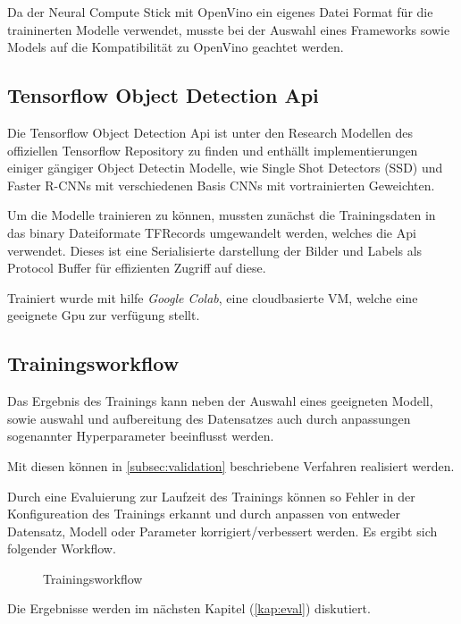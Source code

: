 Da der Neural Compute Stick mit OpenVino ein eigenes Datei Format 
für die traininerten Modelle verwendet, musste bei der Auswahl
eines Frameworks sowie Models auf die Kompatibilität zu OpenVino 
geachtet werden. 



\subsection{Tensorflow Object Detection Api}

Die Tensorflow Object Detection Api ist unter den Research Modellen
\cite{tfobjdet} des offiziellen Tensorflow Repository zu
finden und enthällt implementierungen einiger gängiger Object Detectin
Modelle, wie Single Shot Detectors (SSD) und Faster R-CNNs mit 
verschiedenen Basis CNNs mit vortrainierten Geweichten.

Um die Modelle trainieren zu können, mussten zunächst die 
Trainingsdaten in das binary Dateiformate TFRecords umgewandelt 
werden, welches die Api verwendet. Dieses ist eine Serialisierte 
darstellung der Bilder und Labels als Protocol Buffer für
effizienten Zugriff auf diese.

Trainiert wurde mit hilfe \textit{Google Colab}, eine cloudbasierte VM,
welche eine geeignete Gpu zur verfügung stellt.


\subsection{Trainingsworkflow}

Das Ergebnis des Trainings kann neben der Auswahl eines geeigneten 
Modell, sowie auswahl und aufbereitung des Datensatzes auch durch 
anpassungen sogenannter Hyperparameter beeinflusst werden.

Mit diesen können in \ref{subsec:validation} beschriebene 
Verfahren realisiert werden.

Durch eine Evaluierung zur Laufzeit des Trainings können so Fehler 
in der Konfigureation des Trainings erkannt und durch anpassen von 
entweder Datensatz, Modell oder Parameter korrigiert/verbessert 
werden.
Es ergibt sich folgender Workflow.

\begin{figure}[H]
    \centering
    \def\svgwidth{0.7\textwidth}
    
    \caption{Trainingsworkflow}
    \label{fig:train_workflow}
\end{figure}

Die Ergebnisse werden im nächsten Kapitel (\ref{kap:eval}) diskutiert.
